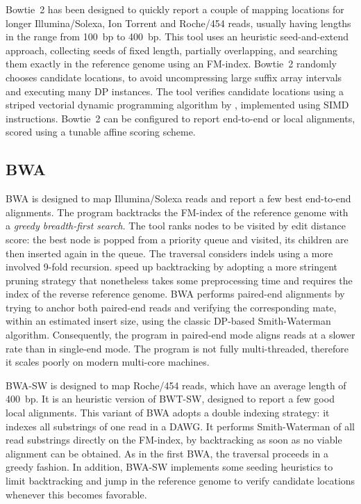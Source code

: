 Bowtie~2 \citep{Langmead2012} has been designed to quickly report a couple of mapping locations for longer Illumina/Solexa, Ion Torrent and Roche/454 reads, usually having lengths in the range from 100~bp to 400~bp.
This tool uses an heuristic seed-and-extend approach, collecting seeds of fixed length, partially overlapping, and searching them exactly in the reference genome using an FM-index.
Bowtie~2 randomly chooses candidate locations, to avoid uncompressing large suffix array intervals and executing many DP instances.
The tool verifies candidate locations using a striped vectorial dynamic programming algorithm by \citep{Farrar2007}, implemented using SIMD instructions.
Bowtie~2 can be configured to report end-to-end or local alignments, scored using a tunable affine scoring scheme.


\subsection{BWA}
\label{background:mappers:bwa}

BWA \citep{Li2009} is designed to map Illumina/Solexa reads and report a few best end-to-end alignments.
The program backtracks the FM-index of the reference genome with a \emph{greedy breadth-first search}.
The tool ranks nodes to be visited by edit distance score: the best node is popped from a priority queue and visited, its children are then inserted again in the queue.
The traversal considers indels using a more involved 9-fold recursion.
\citeauthor{Li2009} speed up backtracking by adopting a more stringent pruning strategy \citep{Maekinen2010} that nonetheless takes some preprocessing time and requires the index of the reverse reference genome.
BWA performs paired-end alignments by trying to anchor both paired-end reads and verifying the corresponding mate, within an estimated insert size, using the classic DP-based Smith-Waterman algorithm.
Consequently, the program in paired-end mode aligns reads at a slower rate than in single-end mode.
The program is not fully multi-threaded, therefore it scales poorly on modern multi-core machines.

BWA-SW \citep{Li2010a} is designed to map Roche/454 reads, which have an average length of 400~bp.
It is an heuristic version of BWT-SW, designed to report a few good local alignments.
This variant of BWA adopts a double indexing strategy: it indexes all substrings of one read in a DAWG.
It performs Smith-Waterman of all read substrings directly on the FM-index, by backtracking as soon as no viable alignment can be obtained.
As in the first BWA, the traversal proceeds in a greedy fashion.
In addition, BWA-SW implements some seeding heuristics to limit backtracking and jump in the reference genome to verify candidate locations whenever this becomes favorable.

